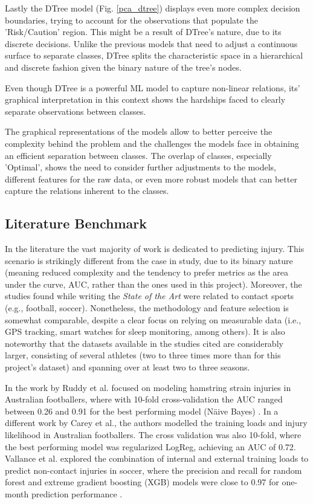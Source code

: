 \documentclass[conference]{IEEEtran}
\begin{document}
Lastly the DTree model (Fig. \ref{pca_dtree}) displays even more complex decision boundaries, trying to account for the observations that populate the 'Risk/Caution' region. This might be a result of DTree's nature, due to its discrete decisions. Unlike the previous models that need to adjust a continuous surface to separate classes, DTree splits the characteristic space in a hierarchical and discrete fashion given the binary nature of the tree's nodes.

Even though DTree is a powerful ML model to capture non-linear relations, its' graphical interpretation in this context shows the hardships faced to clearly separate observations between classes.

The graphical representations of the models allow to better perceive the complexity behind the problem and the challenges the models face in obtaining an efficient separation between classes. The overlap of classes, especially 'Optimal', shows the need to consider further adjustments to the models, different features for the raw data, or even more robust models that can better capture the relations inherent to the classes.

\subsection{Literature Benchmark}

In the literature the vast majority of work is dedicated to predicting injury. This scenario is strikingly different from the case in study, due to its binary nature (meaning reduced complexity and the tendency to prefer metrics as the area under the curve, AUC, rather than the ones used in this project). Moreover, the studies found while writing the \textit{State of the Art} were related to contact sports (e.g., football, soccer). Nonetheless, the methodology and feature selection is somewhat comparable, despite a clear focus on relying on measurable data (i.e., GPS tracking, smart watches for sleep monitoring, among others). It is also noteworthy that the datasets available in the studies cited are considerably larger, consisting of several athletes (two to three times more than for this project's dataset) and spanning over at least two to three seasons. 

In the work by Ruddy et al. focused on modeling hamstring strain injuries in Australian footballers, where with 10-fold cross-validation the AUC ranged between 0.26 and 0.91 for the best performing model (Näive Bayes) \cite{ruddy2018predictive}. In a different work by Carey et al., the authors modelled the training loads and injury likelihood in Australian footballers. The cross validation was also 10-fold, where the best performing model was regularized LogReg, achieving an AUC of 0.72. Vallance et al. explored the combination of internal and external training loads to predict non-contact injuries in soccer, where the precision and recall for random forest and extreme gradient boosting (XGB) models were close to 0.97 for one-month prediction performance \cite{Carey_2018}.
\end{document}
